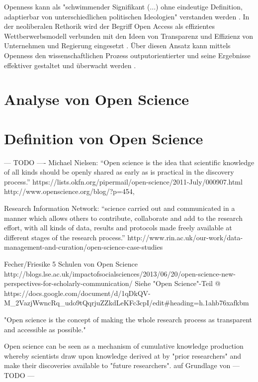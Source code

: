 Openness kann als "schwimmender Signifikant (...) ohne eindeutige Definition, adaptierbar von unterschiedlichen politischen Ideologien" verstanden werden \cite{Adema_2014_open_access}. In der neoliberalen Rethorik wird der Begriff Open Access als effizientes Wettberwerbsmodell verbunden mit den Ideen von Transparenz und Effizienz von Unternehmen und Regierung eingesetzt \cite{tkacz_2012_open}. Über diesen Ansatz kann mittels Openness den wissenschaftlichen Prozess outputorientierter und seine Ergebnisse effektiver gestaltet und überwacht werden \cite{adema_2010_oaoverview} . 

\section{Analyse von Open Science} 


\section{Definition von Open Science} 
--- TODO ---- Michael Nielsen: “Open science is the idea that scientific knowledge of all kinds should be openly shared as early as is practical in the discovery process.”  https://lists.okfn.org/pipermail/open-science/2011-July/000907.html
http://www.openscience.org/blog/?p=454,

Research Information Network: “science carried out and communicated in a manner which allows others to contribute, collaborate and add to the research effort, with all kinds of data, results and protocols made freely available at different stages of the research process.” http://www.rin.ac.uk/our-work/data-management-and-curation/open-science-case-studies

Fecher/Friesike 5 Schulen von Open Science http://blogs.lse.ac.uk/impactofsocialsciences/2013/06/20/open-science-new-perspectives-for-scholarly-communication/ 
Siehe "Open Science"-Teil @ https://docs.google.com/document/d/1qDkQV-M_2VazjWwncRq_udo9tQqrjuZZkdLeKFc3cpI/edit#heading=h.1ahb76xafkbm

"Open science is the concept of making the whole research process as transparent and accessible as possible."\cite{Scheliga_2014}

Open science can be seen as a mechanism of cumulative knowledge production whereby scientists draw upon knowledge derived at by "prior researchers" and make their discoveries available to "future researchers". \cite{Scheliga_2014} auf Grundlage von \cite{Mukherjee_2009}
--- TODO ---

